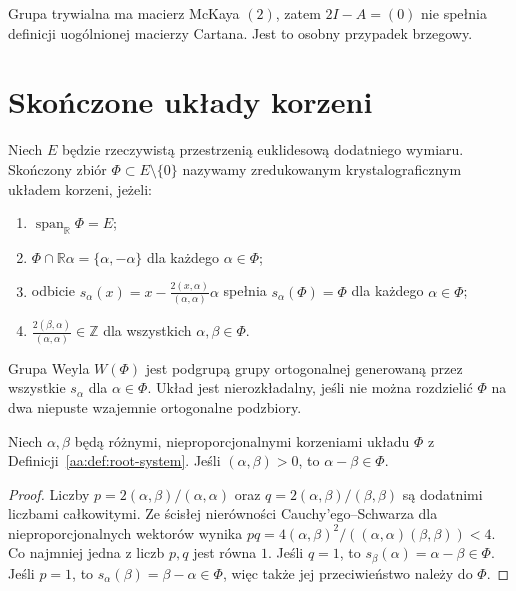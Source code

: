 Grupa trywialna ma macierz McKaya $(2)$, zatem
$2I-A=(0)$ nie spełnia definicji uogólnionej macierzy
Cartana. Jest to osobny przypadek brzegowy.

\section{Skończone układy korzeni}

\begin{definicja}
\label{aa:def:root-system}
Niech $E$ będzie rzeczywistą przestrzenią euklidesową
dodatniego wymiaru. Skończony zbiór $\Phi\subset E\setminus\{0\}$
nazywamy zredukowanym krystalograficznym układem korzeni,
jeżeli:
\begin{enumerate}
\item $\operatorname{span}_{\mathbb R}\Phi=E$;
\item $\Phi\cap\mathbb R\alpha=\{\alpha,-\alpha\}$
      dla każdego $\alpha\in\Phi$;
\item odbicie $s_\alpha(x)=x-
      \frac{2(x,\alpha)}{(\alpha,\alpha)}\alpha$
      spełnia $s_\alpha(\Phi)=\Phi$ dla każdego $\alpha\in\Phi$;
\item $\frac{2(\beta,\alpha)}{(\alpha,\alpha)}\in\mathbb Z$
      dla wszystkich $\alpha,\beta\in\Phi$.
\end{enumerate}
Grupa Weyla $W(\Phi)$ jest podgrupą grupy ortogonalnej
generowaną przez wszystkie $s_\alpha$ dla $\alpha\in\Phi$.
Układ jest nierozkładalny, jeśli nie można rozdzielić
$\Phi$ na dwa niepuste wzajemnie ortogonalne podzbiory.
\end{definicja}

\begin{lemat}
\label{aa:lem:root-difference}
Niech $\alpha,\beta$ będą różnymi, nieproporcjonalnymi
korzeniami układu $\Phi$ z Definicji~\ref{aa:def:root-system}.
Jeśli $(\alpha,\beta)>0$, to $\alpha-\beta\in\Phi$.
\end{lemat}
\begin{proof}
Liczby $p=2(\alpha,\beta)/(\alpha,\alpha)$ oraz
$q=2(\alpha,\beta)/(\beta,\beta)$ są dodatnimi
liczbami całkowitymi. Ze ścisłej nierówności
Cauchy'ego--Schwarza dla nieproporcjonalnych wektorów
wynika $pq=4(\alpha,\beta)^2/
((\alpha,\alpha)(\beta,\beta))<4$.
Co najmniej jedna z liczb $p,q$ jest równa $1$.
Jeśli $q=1$, to $s_\beta(\alpha)=\alpha-\beta\in\Phi$.
Jeśli $p=1$, to $s_\alpha(\beta)=\beta-\alpha\in\Phi$,
więc także jej przeciwieństwo należy do $\Phi$.
\end{proof}

